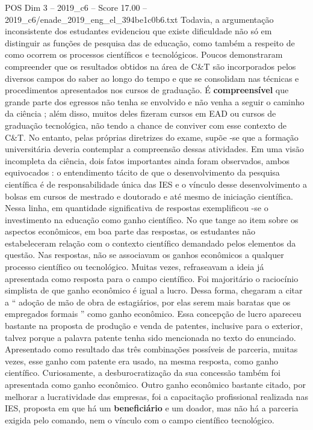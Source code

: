 \begin{textsample}{POS Dim 3 – 2019\_c6 – Score 17.00 – 2019\_c6/enade\_2019\_eng\_el\_394be1c0b6.txt}
Todavia, a argumentação inconsistente dos estudantes evidenciou que existe dificuldade não só em distinguir as funções de pesquisa das de educação, como também a respeito de como ocorrem os processos científicos e tecnológicos.
Poucos demonstraram compreender que os resultados obtidos na área de C\&T são incorporados pelos diversos campos do saber ao longo do tempo e que se consolidam nas técnicas e procedimentos apresentados nos cursos de graduação.
É \textbf{compreensível} que grande parte dos egressos não tenha se envolvido e não venha a seguir o caminho da ciência ; além disso, muitos deles fizeram cursos em EAD ou cursos de graduação tecnológica, não tendo a chance de conviver com esse contexto de C\&T.
No entanto, pelas próprias diretrizes do exame, supõe -se que a formação universitária deveria contemplar a compreensão dessas atividades.
Em uma visão incompleta da ciência, dois fatos importantes ainda foram observados, ambos equivocados : o entendimento tácito de que o desenvolvimento da pesquisa científica é de responsabilidade única das IES e o vínculo desse desenvolvimento a bolsas em cursos de mestrado e doutorado e até mesmo de iniciação científica.
Nessa linha, em quantidade significativa de respostas exemplificou -se o investimento na educação como ganho científico.
No que tange ao item sobre os aspectos econômicos, em boa parte das respostas, os estudantes não estabeleceram relação com o contexto científico demandado pelos elementos da questão.
Nas respostas, não se associavam os ganhos econômicos a qualquer processo científico ou tecnológico.
Muitas vezes, refraseavam a ideia já apresentada como resposta para o campo científico.
Foi majoritário o raciocínio simplista de que ganho econômico é igual a lucro.
Dessa forma, chegaram a citar a “ adoção de mão de obra de estagiários, por elas serem mais baratas que os empregados formais ” como ganho econômico.
Essa concepção de lucro apareceu bastante na proposta de produção e venda de patentes, inclusive para o exterior, talvez porque a palavra patente tenha sido mencionada no texto do enunciado.
Apresentado como resultado das três combinações possíveis de parceria, muitas vezes, esse ganho com patente era usado, na mesma resposta, como ganho científico.
Curiosamente, a desburocratização da sua concessão também foi apresentada como ganho econômico.
Outro ganho econômico bastante citado, por melhorar a lucratividade das empresas, foi a capacitação profissional realizada nas IES, proposta em que há um \textbf{beneficiário} e um doador, mas não há a parceria exigida pelo comando, nem o vínculo com o campo científico tecnológico.

\end{textsample}
